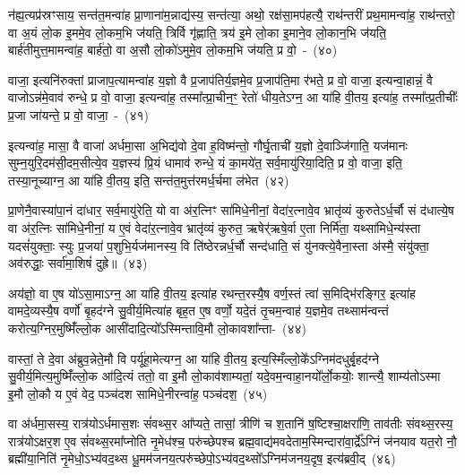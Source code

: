 न॑ह्य॒त्यप्र॑स्रꣳसाय॒ सन्त॑त॒मन्वा॑ह प्रा॒णाना॑म॒न्नाद्य॑स्य॒ सन्त॑त्या॒ अथो॒ रक्ष॑सा॒मप॑हत्यै॒ राथ॑न्तरीं प्रथ॒मामन्वा॑ह॒ राथ॑न्तरो॒ वा अ॒यं लो॒क इ॒ममे॒व लो॒कम॒भि ज॑यति॒ त्रिर्वि गृ॑ह्णाति॒ त्रय॑ इ॒मे लो॒का इ॒माने॒व लो॒कान॒भि ज॑यति॒ बार्\mbox{}ह॑तीमुत्त॒मामन्वा॑ह॒ बार्\mbox{}ह॑तो॒ वा अ॒सौ लो॒को॑\-ऽमुमे॒व लो॒कम॒भि ज॑यति॒ प्र वो॒~-~(४०)\ip

वाजा॒ इत्यनि॑रुक्तां प्राजाप॒त्यामन्वा॑ह य॒ज्ञो वै प्र॒जा\-प॑तिर्य॒ज्ञमे॒व प्र॒जा\-प॑ति॒मा र॑भते॒ प्र वो॒ वाजा॒ इत्यन्वा॒हान्नं॒ वै वाजो\-ऽन्न॑मे॒वाव॑ रुन्धे॒ प्र वो॒ वाजा॒ इत्यन्वा॑ह॒ तस्मा᳚त्प्रा॒चीन॒ꣳ॒ रेतो॑ धीय॒ते\-ऽग्न॒ आ या॑हि वी॒तय॒ इत्या॑ह॒ तस्मा᳚त्प्र॒तीचीः᳚ प्र॒जा जा॑यन्ते॒ प्र वो॒ वाजा॒~-~(४१)\ip

इत्यन्वा॑ह॒ मासा॒ वै वाजा॑ अर्धमा॒सा अ॒भिद्य॑वो दे॒वा ह॒विष्म॑न्तो॒ गौर्घृ॒ताची॑ य॒ज्ञो दे॒वाञ्जि॑गाति॒ यज॑मानः सुम्न॒युरि॒दम॑सी॒दम॒सीत्ये॒व य॒ज्ञस्य॑ प्रि॒यं धामाव॑ रुन्धे॒ यं का॒मये॑त॒ सर्व॒मायु॑रिया॒दिति॒ प्र वो॒ वाजा॒ इति॒ तस्या॒नूच्याग्न॒ आ या॑हि वी॒तय॒ इति॒ सन्त॑त॒मुत्त॑रमर्ध॒र्चमा ल॑भेत~(४२)\ip

प्रा॒णेनै॒वास्या॑पा॒नं दा॑धार॒ सर्व॒मायु॑रेति॒ यो वा अ॑र॒त्निꣳ सा॑मिधे॒नीनां॒ वेदा॑र॒त्नावे॒व भ्रातृ॑व्यं कुरुते\-ऽर्ध॒र्चौ सं द॑धात्ये॒ष वा अ॑र॒त्निः सा॑मिधे॒नीनां॒ य ए॒वं वेदा॑र॒त्नावे॒व भ्रातृ॑व्यं कुरुत॒ ऋषेर्॑\mbox{}ऋषे॒र्वा ए॒ता निर्मि॑ता॒ यथ्सा॑मिधे॒न्य॑स्ता यदसं॑युक्ताः॒ स्युः प्र॒जया॑ प॒शुभि॒र्यज॑मानस्य॒ वि ति॑ष्ठेरन्नर्ध॒र्चौ सन्द॑धाति॒ सं यु॑नक्त्ये॒वैना॒स्ता अ॑स्मै॒ संयु॑क्ता॒ अव॑रुद्धाः॒ सर्वा॑मा॒शिषं॑ दुह्रे॥~(४३)\ip


{\anuvakamend[{ब॒र्॒\mbox{}सं वो॑ जायन्ते॒ प्र वो॒ वाजा॑ लभेत दधाति॒ सन्दश॑ च}]}

अय॑ज्ञो॒ वा ए॒ष यो॑\-ऽसा॒मा\-ऽग्न॒ आ या॑हि वी॒तय॒ इत्या॑ह रथन्त॒रस्यै॒ष वर्ण॒स्तं त्वा॑ स॒मिद्भि॑रङ्गिर॒ इत्या॑ह वामदे॒व्यस्यै॒ष वर्णो॑ बृ॒हद॑ग्ने सु॒वीर्य॒मित्या॑ह बृह॒त ए॒ष वर्णो॒ यदे॒तं तृ॒चम॒न्वाह॑ य॒ज्ञमे॒व तथ्साम॑न्वन्तं करोत्य॒ग्निर॒मुष्मिँ॑ल्लो॒क आसी॑दादि॒त्यो᳚\-ऽस्मिन्तावि॒मौ लो॒कावशा᳚न्ता-~(४४)\ip

वास्तां॒ ते दे॒वा अ॑ब्रुव॒न्नेते॒मौ वि पर्यू॑हा॒मेत्यग्न॒ आ या॑हि वी॒तय॒ इत्य॒स्मिँल्लो॒के᳚\-ऽग्निम॑दधुर्बृ॒हद॑ग्ने सु॒वीर्य॒मित्य॒मुष्मिँ॑ल्लो॒क आ॑दि॒त्यं ततो॒ वा इ॒मौ लो॒काव॑शाम्यतां॒ यदे॒वम॒न्वाहा॒नयो᳚र्लो॒कयोः॒ शान्त्यै॒ शाम्य॑तो\-ऽस्मा इ॒मौ लो॒कौ य ए॒वं वेद॒ पञ्च॑दश सामिधे॒नीरन्वा॑ह॒ पञ्च॑दश॒~(४५)\ip

वा अ॑र्धमा॒सस्य॒ रात्र॑यो\-ऽर्धमास॒शः सं॑वथ्स॒र आ᳚प्यते॒ तासां॒ त्रीणि॑ च श॒तानि॑ ष॒ष्टिश्चा॒क्षरा॑णि॒ ताव॑तीः संवथ्स॒रस्य॒ रात्र॑यो\-ऽक्षर॒श ए॒व सं॑वथ्स॒रमा᳚प्नोति नृ॒मेध॑श्च॒ परु॑च्छेपश्च ब्रह्म॒वाद्य॑मवदेताम॒स्मिन्दारा॑वा॒र्द्रे᳚\-ऽग्निं ज॑नयाव यत॒रो नौ॒ ब्रह्मी॑या॒निति॑ नृ॒मेधो॒\-ऽभ्य॑वद॒थ्स धू॒मम॑जनय॒त्परु॑च्छेपो॒\-ऽभ्य॑वद॒थ्सो᳚\-ऽग्निम॑जनय॒दृष॒ इत्य॑ब्रवी॒द्~(४६)\ip

